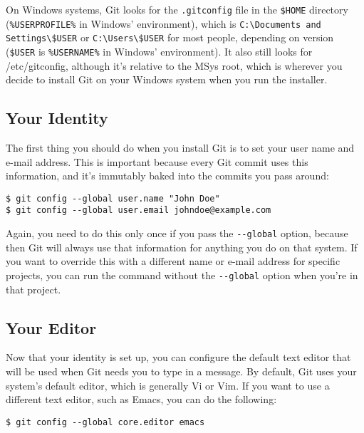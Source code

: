 \documentclass[a4paper]{book}
\newcounter{tab}[chapter]
\begin{document}
On Windows systems, Git looks for the \texttt{.gitconfig} file in the \texttt{\$HOME} directory (\texttt{\%USERPROFILE\%} in Windows' environment), which is \texttt{C:\textbackslash{}Documents and Settings\textbackslash{}\$USER} or \texttt{C:\textbackslash{}Users\textbackslash{}\$USER} for most people, depending on version (\texttt{\$USER} is \texttt{\%USERNAME\%} in Windows' environment). It also still looks for /etc/gitconfig, although it's relative to the MSys root, which is wherever you decide to install Git on your Windows system when you run the installer.

\subsection{Your Identity}\label{your-identity}

The first thing you should do when you install Git is to set your user name and e-mail address. This is important because every Git commit uses this information, and it's immutably baked into the commits you pass around:

\begin{shaded}\begin{verbatim}
$ git config --global user.name "John Doe"
$ git config --global user.email johndoe@example.com
\end{verbatim}\end{shaded}

Again, you need to do this only once if you pass the \texttt{-{}-global} option, because then Git will always use that information for anything you do on that system. If you want to override this with a different name or e-mail address for specific projects, you can run the command without the \texttt{-{}-global} option when you're in that project.

\subsection{Your Editor}\label{your-editor}

Now that your identity is set up, you can configure the default text editor that will be used when Git needs you to type in a message. By default, Git uses your system's default editor, which is generally Vi or Vim. If you want to use a different text editor, such as Emacs, you can do the following:

\begin{shaded}\begin{verbatim}
$ git config --global core.editor emacs
\end{verbatim}\end{shaded}
\end{document}
